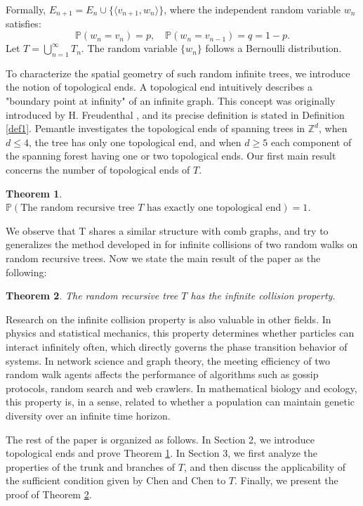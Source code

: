 \documentclass[10pt,twoside]{article}
\newtheorem{theorem}{Theorem}[section]
\begin{document}
Formally, $E_{n+1} = E_n \cup \{\langle v_{n+1}, w_n \rangle\} $, where the independent random variable $ w_n $ satisfies:
$$
    \mathbb{P}(w_n = v_n) = p, \quad \mathbb{P}(w_n = v_{n-1}) = q = 1-p.
$$
Let $T = \bigcup_{n=1}^{\infty} T_n$. The random variable $\{w_n\}$ follows a Bernoulli distribution.

To characterize the spatial geometry of such random infinite trees, we introduce the notion of topological ends. A topological end intuitively describes a "boundary point at infinity" of an infinite graph. This concept was originally introduced by H. Freudenthal \cite{F1942}, and its precise definition is stated in Definition \ref{def1}. Pemantle\cite{P2004} investigates the topological ends of spanning trees in $\mathbb{Z}^d$, when $d \leq 4$, the tree has only one topological end, and when $d \geq 5$ each component of the spanning forest having one or two topological ends. Our first main result concerns the number of topological ends of $T$.

\begin{theorem}\label{thm1}
 $ \mathbb{P}(\text{The random recursive tree  } T \text{ has exactly one topological end}) = 1 $.
\end{theorem}

We observe that T shares a similar structure with comb graphs, and try to generalizes the method developed in \cite{CC2011} for infinite collisions of two random walks on random recursive trees. Now we state the main result of the paper as the following:
\begin{theorem}\label{thm2}
The random recursive tree $ T $ has the infinite collision property.
\end{theorem}

Research on the infinite collision property is also valuable in other fields. In physics and statistical mechanics, this property determines whether particles can interact infinitely often, which directly governs the phase transition behavior of systems. In network science and graph theory, the meeting efficiency of two random walk agents affects the performance of algorithms such as gossip protocols, random search and web crawlers. In mathematical biology and ecology, this property is, in a sense, related to whether a population can maintain genetic diversity over an infinite time horizon.

The rest of the paper is organized as follows. In Section 2, we introduce topological ends and prove Theorem \ref{thm1}. In Section 3, we first analyze the properties of the trunk and branches of $T$, and then discuss the applicability of the sufficient condition given by Chen and Chen \cite{CC2011} to $T$. Finally, we present the proof of Theorem \ref{thm2}.
\end{document}
